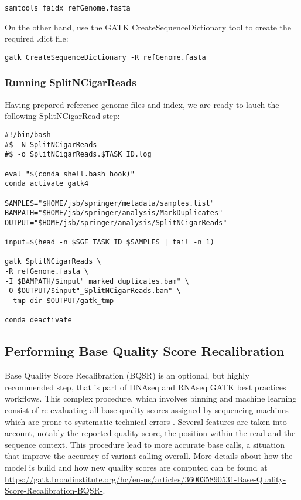 \begin{verbatim}
samtools faidx refGenome.fasta
\end{verbatim}

On the other hand, use the GATK CreateSequenceDictionary tool to create the required .dict file:

\begin{verbatim}
gatk CreateSequenceDictionary -R refGenome.fasta
\end{verbatim}




\subsubsection{Running SplitNCigarReads}

Having prepared reference genome files and index, we are ready to lauch the following SplitNCigarRead step:

\begin{verbatim}
#!/bin/bash
#$ -N SplitNCigarReads
#$ -o SplitNCigarReads.$TASK_ID.log
	
eval "$(conda shell.bash hook)"
conda activate gatk4
	
SAMPLES="$HOME/jsb/springer/metadata/samples.list"
BAMPATH="$HOME/jsb/springer/analysis/MarkDuplicates"
OUTPUT="$HOME/jsb/springer/analysis/SplitNCigarReads"
	
input=$(head -n $SGE_TASK_ID $SAMPLES | tail -n 1)

gatk SplitNCigarReads \
-R refGenome.fasta \
-I $BAMPATH/$input"_marked_duplicates.bam" \
-O $OUTPUT/$input"_SplitNCigarReads.bam" \
--tmp-dir $OUTPUT/gatk_tmp
	
conda deactivate
\end{verbatim}



\subsection{Performing Base Quality Score Recalibration}

Base Quality Score Recalibration (BQSR) is an optional, but highly recommended step, that is part of DNAseq and RNAseq GATK best practices workflows. This complex procedure, which involves binning and machine learning consist of re-evaluating all base quality scores assigned by sequencing machines which are prone to systematic technical errors \cite{GATK_BaseQuality}. Several features are taken into account, notably the reported quality score, the position within the read and the sequence context. This procedure lead to more accurate base calls, a situation that improve the accuracy of variant calling overall. More details about how the model is build and how new quality scores are computed can be found at \href{https://gatk.broadinstitute.org/hc/en-us/articles/360035890531-Base-Quality-Score-Recalibration-BQSR-}{https://gatk.broadinstitute.org/hc/en-us/articles/360035890531-Base-Quality-Score-Recalibration-BQSR-}.

